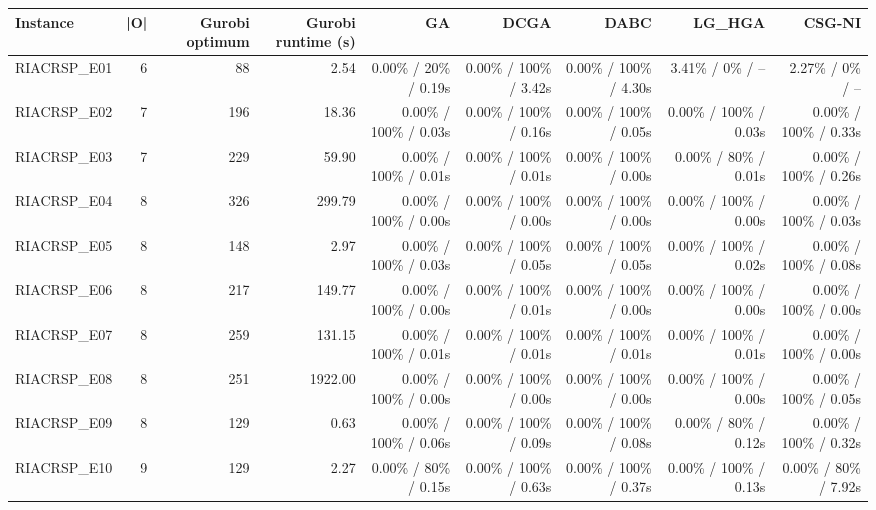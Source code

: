 \begin{tabular}{lrrrrrrrr}
\toprule
Instance & |O| & Gurobi optimum & Gurobi runtime (s) & GA & DCGA & DABC & LG\_HGA & CSG-NI \\
\midrule
RIACRSP\_E01 & 6 & 88 & 2.54 & 0.00\% / 20\% / 0.19s & 0.00\% / 100\% / 3.42s & 0.00\% / 100\% / 4.30s & 3.41\% / 0\% / -- & 2.27\% / 0\% / -- \\
RIACRSP\_E02 & 7 & 196 & 18.36 & 0.00\% / 100\% / 0.03s & 0.00\% / 100\% / 0.16s & 0.00\% / 100\% / 0.05s & 0.00\% / 100\% / 0.03s & 0.00\% / 100\% / 0.33s \\
RIACRSP\_E03 & 7 & 229 & 59.90 & 0.00\% / 100\% / 0.01s & 0.00\% / 100\% / 0.01s & 0.00\% / 100\% / 0.00s & 0.00\% / 80\% / 0.01s & 0.00\% / 100\% / 0.26s \\
RIACRSP\_E04 & 8 & 326 & 299.79 & 0.00\% / 100\% / 0.00s & 0.00\% / 100\% / 0.00s & 0.00\% / 100\% / 0.00s & 0.00\% / 100\% / 0.00s & 0.00\% / 100\% / 0.03s \\
RIACRSP\_E05 & 8 & 148 & 2.97 & 0.00\% / 100\% / 0.03s & 0.00\% / 100\% / 0.05s & 0.00\% / 100\% / 0.05s & 0.00\% / 100\% / 0.02s & 0.00\% / 100\% / 0.08s \\
RIACRSP\_E06 & 8 & 217 & 149.77 & 0.00\% / 100\% / 0.00s & 0.00\% / 100\% / 0.01s & 0.00\% / 100\% / 0.00s & 0.00\% / 100\% / 0.00s & 0.00\% / 100\% / 0.00s \\
RIACRSP\_E07 & 8 & 259 & 131.15 & 0.00\% / 100\% / 0.01s & 0.00\% / 100\% / 0.01s & 0.00\% / 100\% / 0.01s & 0.00\% / 100\% / 0.01s & 0.00\% / 100\% / 0.00s \\
RIACRSP\_E08 & 8 & 251 & 1922.00 & 0.00\% / 100\% / 0.00s & 0.00\% / 100\% / 0.00s & 0.00\% / 100\% / 0.00s & 0.00\% / 100\% / 0.00s & 0.00\% / 100\% / 0.05s \\
RIACRSP\_E09 & 8 & 129 & 0.63 & 0.00\% / 100\% / 0.06s & 0.00\% / 100\% / 0.09s & 0.00\% / 100\% / 0.08s & 0.00\% / 80\% / 0.12s & 0.00\% / 100\% / 0.32s \\
RIACRSP\_E10 & 9 & 129 & 2.27 & 0.00\% / 80\% / 0.15s & 0.00\% / 100\% / 0.63s & 0.00\% / 100\% / 0.37s & 0.00\% / 100\% / 0.13s & 0.00\% / 80\% / 7.92s \\
\bottomrule
\end{tabular}
